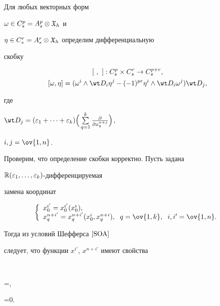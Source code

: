 \begin{pf}
Для любых векторных форм


$ \omega \in C^p_s=A_s^p\otimes {\frak X}_h$ и


$\eta \in C_s^r=A_s^r\otimes {\frak X}_h$ определим дифференциальную


скобку


\begin{gather*}


[\ ,\ ]: C_s^p\times C_s^r\to C_s^{p+r}, \\


%


[\omega, \eta]=(\omega^i \wedge \wt D_i\eta^j -(-1)^{pr}\eta^i


\wedge \wt D_i \omega^j) \wt D_j,


\end{gather*}


где


$\wt  D_j=(\varepsilon _1+ \dotsb + \varepsilon_k)


\Big(\sum\limits_{q=1}^{k}\frac{\partial}{\partial x_{q}^{n+j}}\Big)$,


$i,j=\ov{1,n}$.





Проверим, что определение скобки корректно. Пусть задана


${\Bbb R}(\varepsilon_1, \dotsc, \varepsilon_k)$-дифференцируемая


замена координат


$$


\left\{


\begin{array}{l}


x_0^{i'}=x_0^{i'}(x_0^i),\\


x_q^{n+i'}=x_{q}^{n+i'}(x_0^i,x_q^{n+i}),\ \; q=\ov{1,k}, \ \;


i,i'=\ov{1,n}.


\end{array}


\right.


$$


Тогда из условий Шефферса $\cite{SOA}$


следует, что функции $x^{i'}$, $x^{n+i'}$ имеют свойства


$$


=,


\quad {}=0.



\end{pf}
